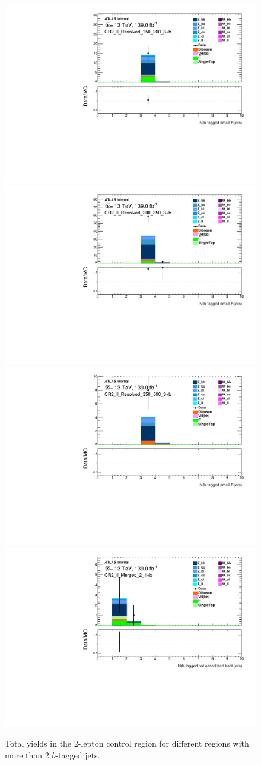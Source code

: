 \begin{figure}[!htb]
    \includegraphics[width=0.46\linewidth]{chapters/c8/figures/2L/DataMC_MonoH_Nominal_CR2_ll_Resolved_150_200_3+b_N_BJets_04.pdf}
    \includegraphics[width=0.46\linewidth]{chapters/c8/figures/2L/DataMC_MonoH_Nominal_CR2_ll_Resolved_200_350_3+b_N_BJets_04.pdf}\\
    \includegraphics[width=0.46\linewidth]{chapters/c8/figures/2L/DataMC_MonoH_Nominal_CR2_ll_Resolved_350_500_3+b_N_BJets_04.pdf}
    \includegraphics[width=0.46\linewidth]{chapters/c8/figures/2L/DataMC_MonoH_Nominal_CR2_ll_Merged_2_1+b_N_BTags_not_associated_02.pdf}
    \caption{Total yields in the 2-lepton control region for different \met regions with more than 2 $b$-tagged jets.}
    \label{fig:data-mc-2l-ll-mjj-3+b}
\end{figure}
